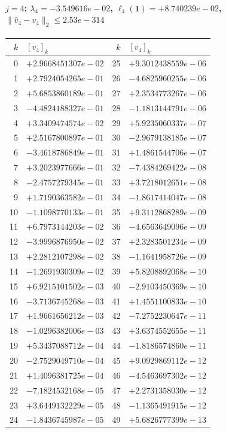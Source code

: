 \paragraph{$j = 4$: $\lambda_{4} = -3.549616e-02$, \quad $\ell_{4}(\mathbf{1}) = +8.740239e-02$, \quad $\|\hat{v}_{4} - v_{4}\|_2 \leq 2.53e-314$}
\begin{center}
{\footnotesize
\begin{tabular}{r@{\;\;}l@{\quad}r@{\;\;}l}
\toprule
$k$ & $[v_{4}]_k$ & $k$ & $[v_{4}]_k$ \\
\midrule
0 & $+2.9668451307e-02$ & 25 & $+9.3012438559e-06$ \\
1 & $+2.7924054265e-01$ & 26 & $-4.6825960255e-06$ \\
2 & $+5.6853860189e-01$ & 27 & $+2.3534773267e-06$ \\
3 & $-4.4824188327e-01$ & 28 & $-1.1813144791e-06$ \\
4 & $+3.3409474574e-02$ & 29 & $+5.9235060337e-07$ \\
5 & $+2.5167800897e-01$ & 30 & $-2.9679138185e-07$ \\
6 & $-3.4618786849e-01$ & 31 & $+1.4861544706e-07$ \\
7 & $+3.2023977666e-01$ & 32 & $-7.4384269422e-08$ \\
8 & $-2.4757279345e-01$ & 33 & $+3.7218012651e-08$ \\
9 & $+1.7190363582e-01$ & 34 & $-1.8617414047e-08$ \\
10 & $-1.1098770133e-01$ & 35 & $+9.3112868289e-09$ \\
11 & $+6.7973144203e-02$ & 36 & $-4.6563649096e-09$ \\
12 & $-3.9996876950e-02$ & 37 & $+2.3283501234e-09$ \\
13 & $+2.2812107298e-02$ & 38 & $-1.1641958726e-09$ \\
14 & $-1.2691930309e-02$ & 39 & $+5.8208892068e-10$ \\
15 & $+6.9215101502e-03$ & 40 & $-2.9103450369e-10$ \\
16 & $-3.7136745268e-03$ & 41 & $+1.4551100833e-10$ \\
17 & $+1.9661656212e-03$ & 42 & $-7.2752230647e-11$ \\
18 & $-1.0296382006e-03$ & 43 & $+3.6374552655e-11$ \\
19 & $+5.3437088712e-04$ & 44 & $-1.8186574860e-11$ \\
20 & $-2.7529049710e-04$ & 45 & $+9.0929869112e-12$ \\
21 & $+1.4096381725e-04$ & 46 & $-4.5463697302e-12$ \\
22 & $-7.1824532168e-05$ & 47 & $+2.2731358030e-12$ \\
23 & $+3.6449132229e-05$ & 48 & $-1.1365491915e-12$ \\
24 & $-1.8436745987e-05$ & 49 & $+5.6826777399e-13$ \\
\bottomrule
\end{tabular}
}
\end{center}

